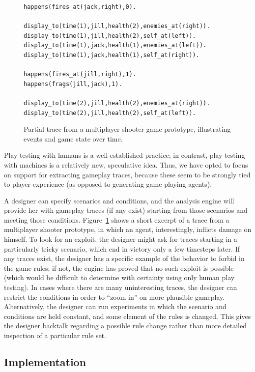 \documentclass[letterpaper]{article}
\begin{document}
\begin{figure}
\begin{Verbatim}[frame=single,fontsize=\scriptsize]
happens(fires_at(jack,right),0).

display_to(time(1),jill,health(2),enemies_at(right)).
display_to(time(1),jill,health(2),self_at(left)).
display_to(time(1),jack,health(1),enemies_at(left)).
display_to(time(1),jack,health(1),self_at(right)).

happens(fires_at(jill,right),1).
happens(frags(jill,jack),1).

display_to(time(2),jill,health(2),enemies_at(right)).
display_to(time(2),jill,health(2),self_at(left)).
\end{Verbatim}
\caption{Partial trace from a multiplayer shooter game prototype, illustrating
events and game state over time.}
\label{fig:trace}
\end{figure}

Play testing with humans is a well established practice; in contrast, play
testing with machines is a relatively new, speculative idea. Thus, we have
opted to focus on support for extracting gameplay traces, because these seem to
be strongly tied to player experience (as opposed to generating game-playing
agents).

A designer can specify scenarios and conditions, and the analysis engine will
provide her with gameplay traces (if any exist) starting from those scenarios
and meeting those conditions. Figure~\ref{fig:trace} shows a short excerpt of a
trace from a multiplayer shooter prototype, in which an agent, interestingly,
inflicts damage on himself. To look for an exploit, the designer might ask for
traces starting in a particularly tricky scenario, which end in victory only a
few timesteps later. If any traces exist, the designer has a specific example
of the behavior to forbid in the game rules; if not, the engine has proved that
no such exploit is possible (which would be difficult to determine with
certainty using only human play testing). In cases where there are many
uninteresting traces, the designer can restrict the conditions in order to
``zoom in'' on more plausible gameplay. Alternatively, the designer can run
experiments in which the scenario and conditions are held constant, and some
element of the rules is changed. This gives the designer backtalk regarding a
possible rule change rather than more detailed inspection of a particular rule
set.

\subsection{Implementation}
\end{document}

